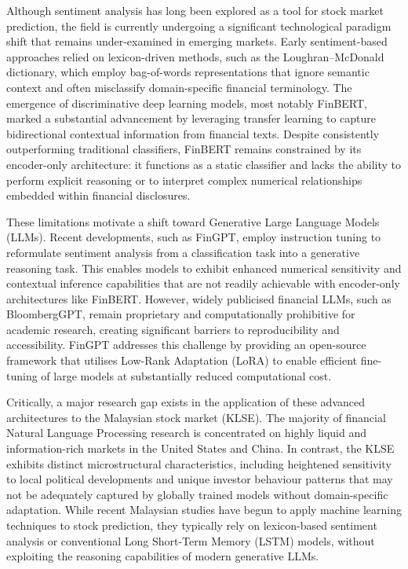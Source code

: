 \documentclass[singlespace]{ucetd}
\begin{document}
Although sentiment analysis has long been explored as a tool for stock market prediction, the field is currently undergoing a significant technological paradigm shift that remains under-examined in emerging markets. Early sentiment-based approaches relied on lexicon-driven methods, such as the Loughran--McDonald dictionary, which employ bag-of-words representations that ignore semantic context and often misclassify domain-specific financial terminology. The emergence of discriminative deep learning models, most notably FinBERT, marked a substantial advancement by leveraging transfer learning to capture bidirectional contextual information from financial texts. Despite consistently outperforming traditional classifiers, FinBERT remains constrained by its encoder-only architecture: it functions as a static classifier and lacks the ability to perform explicit reasoning or to interpret complex numerical relationships embedded within financial disclosures.

These limitations motivate a shift toward Generative Large Language Models (LLMs). Recent developments, such as FinGPT, employ instruction tuning to reformulate sentiment analysis from a classification task into a generative reasoning task. This enables models to exhibit enhanced numerical sensitivity and contextual inference capabilities that are not readily achievable with encoder-only architectures like FinBERT. However, widely publicised financial LLMs, such as BloombergGPT, remain proprietary and computationally prohibitive for academic research, creating significant barriers to reproducibility and accessibility. FinGPT addresses this challenge by providing an open-source framework that utilises Low-Rank Adaptation (LoRA) to enable efficient fine-tuning of large models at substantially reduced computational cost.

Critically, a major research gap exists in the application of these advanced architectures to the Malaysian stock market (KLSE). The majority of financial Natural Language Processing research is concentrated on highly liquid and information-rich markets in the United States and China. In contrast, the KLSE exhibits distinct microstructural characteristics, including heightened sensitivity to local political developments and unique investor behaviour patterns that may not be adequately captured by globally trained models without domain-specific adaptation. While recent Malaysian studies have begun to apply machine learning techniques to stock prediction, they typically rely on lexicon-based sentiment analysis or conventional Long Short-Term Memory (LSTM) models, without exploiting the reasoning capabilities of modern generative LLMs.
\end{document}
